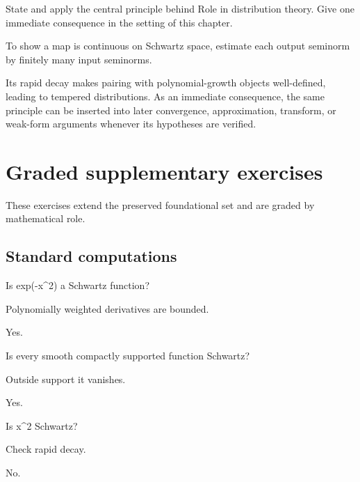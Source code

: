 \begin{exercise}\label{exr:iii14-08}
State and apply the central principle behind Role in distribution theory. Give one immediate consequence in the setting of this chapter.
\end{exercise}
\begin{hint}
To show a map is continuous on Schwartz space, estimate each output seminorm by finitely many input seminorms.
\end{hint}
\begin{solution}
Its rapid decay makes pairing with polynomial-growth objects well-defined, leading to tempered distributions. As an immediate consequence, the same principle can be inserted into later convergence, approximation, transform, or weak-form arguments whenever its hypotheses are verified.
\end{solution}


\section{Graded supplementary exercises}
These exercises extend the preserved foundational set and are graded by mathematical role.

\subsection*{Standard computations}

\begin{exercise}[Gaussian]\label{exr:iii14-expand-01}
Is exp(-x\textasciicircum{}2) a Schwartz function?
\end{exercise}
\begin{hint}
Polynomially weighted derivatives are bounded.
\end{hint}
\begin{solution}
Yes.
\end{solution}

\begin{exercise}\label{exr:iii14-expand-02}
Is every smooth compactly supported function Schwartz?
\end{exercise}
\begin{hint}
Outside support it vanishes.
\end{hint}
\begin{solution}
Yes.
\end{solution}

\begin{exercise}[Polynomial]\label{exr:iii14-expand-03}
Is x\textasciicircum{}2 Schwartz?
\end{exercise}
\begin{hint}
Check rapid decay.
\end{hint}
\begin{solution}
No.
\end{solution}

